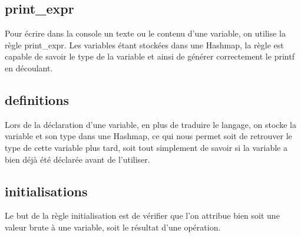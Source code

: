 \subsection{print\_expr}
    Pour écrire dans la console un texte ou le contenu d'une variable, on utilise la règle print\_expr. Les variables étant stockées dans une Hashmap, la règle est capable de savoir le type de la variable et ainsi de générer correctement le printf en découlant.
    
\subsection{definitions}
    Lors de la déclaration d'une variable, en plus de traduire le langage, on stocke la variable et son type dans une Hashmap, ce qui nous permet soit de retrouver le type de cette variable plus tard, soit tout simplement de savoir si la variable a bien déjà été déclarée avant de l'utiliser.

\subsection{initialisations}
    Le but de la règle initialisation est de vérifier que l'on attribue bien soit une valeur brute à une variable, soit le résultat d'une opération.